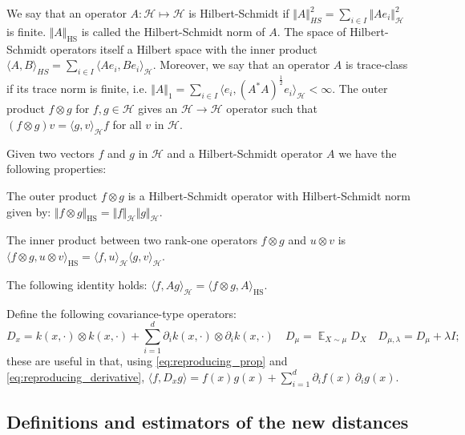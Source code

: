 \documentclass{article}
\DeclareMathOperator{\E}{\mathbb E}
\newcommand{\h}{\mathcal H}
\newcommand{\hs}{\mathrm{HS}}
\begin{document}
We say that an operator $A:\h\mapsto\h$ is Hilbert-Schmidt if $\Vert A\Vert_{HS}^{2}=\sum_{i\in I}\Vert Ae_{i}\Vert_{\h}^{2}$
is finite. $\Vert A\Vert_\hs$ is called the Hilbert-Schmidt norm
of $A$. The space of Hilbert-Schmidt operators itself a Hilbert space
with the inner product $\langle A,B\rangle_{HS}=\sum_{i\in I}\langle Ae_{i},Be_{i}\rangle_{\h}$.
Moreover, we say that an operator $A$ is trace-class if its trace
norm is finite, i.e. $\Vert A\Vert_{1}=\sum_{i\in I}\langle e_{i},(A^{*}A)^{\frac{1}{2}}e_{i}\rangle_{\h}<\infty$.
The outer product $f \otimes g$ for $f, g \in \h$
gives an $\h \to \h$ operator such that
$(f \otimes g) v = \langle g, v\rangle_{\h} f$ for all $v$ in $\h$.

Given two vectors $f$ and $g$ in $\h$ and a Hilbert-Schmidt operator
$A$ we have the following properties:
\begin{proplist}
  \item \label{HS_norm_rank_one}
    The outer product $f\otimes g$ is a Hilbert-Schmidt operator with Hilbert-Schmidt norm given by: $\Vert f\otimes g\Vert_\hs = \Vert f\Vert_{\h}\Vert g\Vert_{\h}$.
  \item \label{HS_inner_rank_one}
    The inner product between two rank-one operators $f\otimes g$ and $u\otimes v$ is
    $\langle f\otimes g,u\otimes v\rangle_\hs=\langle f,u\rangle_{\h}\langle g,v\rangle_{\h}$.
  \item \label{HS_inner_prod_rank_one}
    The following identity holds: $\langle f, Ag\rangle_\h = \langle f\otimes g, A\rangle_{\hs}$.
\end{proplist}

Define the following covariance-type operators:
\begin{equation}
     D_x
   = k(x, \cdot) \otimes k(x, \cdot) + \sum_{i=1}^d \partial_i k(x, \cdot) \otimes \partial_i k(x, \cdot)
  \quad
     D_\mu
   = \E_{X \sim \mu} D_X
  \quad
     D_{\mu,\lambda}
   = D_\mu + \lambda I
\label{eq:d-op}
;\end{equation}
these are useful in that, using \eqref{eq:reproducing_prop} and \eqref{eq:reproducing_derivative},
$\langle f, D_x g \rangle = f(x) g(x) + \sum_{i=1}^d \partial_i f(x) \, \partial_i g(x)$.

\subsection{Definitions and estimators of the new distances} \label{sec:proofs:distances}
\end{document}
